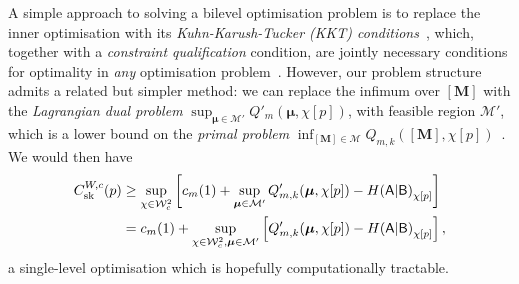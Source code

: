 \documentclass[10pt, a4paper]{article}
\numberwithin{equation}{section} %
\theoremstyle{definition}
\theoremstyle{plain}
\newcommand{\?}{\mathrel{?}} %
\newcommand{\cvec}[1]{\boldsymbol{\mathbf{#1}}}    %
\newcommand{\matr}[2][]{\left[\mathbf{#2}#1\right]} %
\newcommand{\sM}{\mathcal{M}}
\newcommand{\sW}{\mathcal{W}}
\newcommand{\crv}[1]{\mathsf{#1}}
\newcommand{\sk}{\rm sk}
\begin{document}
                  A simple approach to solving a bilevel optimisation problem is to replace the inner optimisation with its \emph{Kuhn-Karush-Tucker (KKT) conditions}~\cite{BilevelReview}, which, together with a \emph{constraint qualification} condition, are jointly necessary conditions for optimality in \emph{any} optimisation problem~\cite[Ch. 11.5]{LuenbergerYe}. However, our problem structure admits a related but simpler method: we can replace the infimum over \(\matr{M}\) with the \emph{Lagrangian dual problem} \(\sup_{\cvec{\mu} \in \sM'} Q'_m(\cvec{\mu}, \chi[p])\), with feasible region \(\sM'\), which is a lower bound on the \emph{primal problem} \(\inf_{\matr{M} \in \sM} Q_{m,k}(\matr{M}, \chi[p])\)~\cite[Ch. 5.9.1]{BoydVand}. We would then have
                  \begin{align}
                    C^{W,c}_{\sk}(p) &\geq \sup_{\chi\in\sW_c^2} \left[ c_m(1) + \sup_{\cvec{\mu} \in \sM'} Q_{m,k}'(\cvec{\mu}, \chi[p]) - H{(\crv{A}|\crv{B})}_{\chi[p]} \right] \\
                                 &= c_m(1) + \sup_{\chi\in\sW_c^2, \cvec{\mu} \in \sM'} \left[ Q_{m,k}'(\cvec{\mu}, \chi[p]) - H{(\crv{A}|\crv{B})}_{\chi[p]} \right],\label{eqn:wircap_dual}
                  \end{align}
                  a single-level optimisation which is hopefully computationally tractable.
\end{document}
